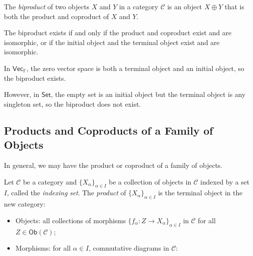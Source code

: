 \documentclass[
	11pt, %
	fleqn, %
	a4paper, %
]{LegrandOrangeBook}
\newcommand{\F}{\mathbb{F}} %
\newcommand{\C}{\mathcal{C}} %
\newcommand{\Set}{\boldsymbol{\mathsf{Set}}} %
\newcommand{\Vect}{\boldsymbol{\mathsf{Vec}}} %
\newcommand{\Ob}[1]{\mathsf{Ob}(#1)} %
\begin{document}
\begin{definition}[Biproducts]
    The \emph{biproduct} of two objects $X$ and $Y$ in a category $\C$ is an object $X \oplus Y$ that is both the product and coproduct of $X$ and $Y$.
\end{definition}

\begin{remark}
    The biproduct exists if and only if the product and coproduct exist and are isomorphic, or if the initial object and the terminal object exist and are isomorphic.
\end{remark}

\begin{example}
    In $\Vect_{\F}$, the zero vector space is both a terminal object and an initial object, so the biproduct exists.
\end{example}

However, in $\Set$, the empty set is an initial object but the terminal object is any singleton set, so the biproduct does not exist.

\subsection{Products and Coproducts of a Family of Objects}

In general, we may have the product or coproduct of a family of objects.

Let $\C$ be a category and $\{ X_{\alpha} \}_{\alpha \in I}$ be a collection of objects in $\C$ indexed by a set $I$, called the \emph{indexing set}. The \emph{product} of $\{ X_{\alpha} \}_{\alpha \in I}$ is the terminal object in the new category:
\begin{itemize}
    \item Objects: all collections of morphisms $\{ f_{\alpha} : Z \to X_{\alpha} \}_{\alpha \in I}$ in $\C$ for all $Z \in \Ob{\C}$;
    \item Morphisms: for all $\alpha \in I$, commutative diagrams in $\C$:
\end{itemize}
\begin{center}
\end{center}
\end{document}
